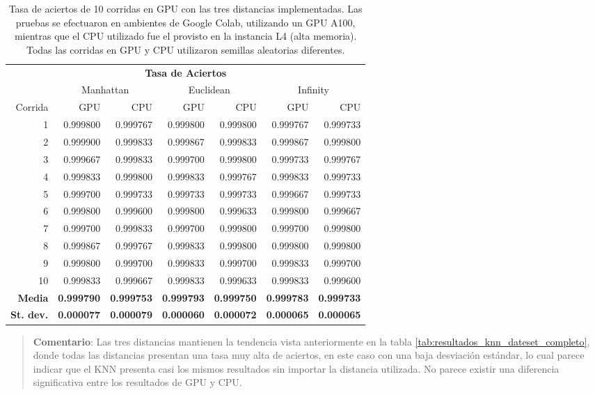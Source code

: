 \documentclass{article}
\begin{document}
\begin{enumerate}
\begin{enumerate}
\begin{enumerate}
\begin{table}[H]
    \centering
\begin{tabular}{r|rrrrrr}
    \toprule
    \multicolumn{7}{c}{\textbf{Tasa de Aciertos}}\\    
    & \multicolumn{2}{c}{Manhattan} & \multicolumn{2}{c}{Euclidean} & \multicolumn{2}{c}{Infinity} \\
    Corrida & GPU & CPU & GPU & CPU & GPU & CPU \\
    \midrule
    1 & 0.999800 & 0.999767 & 0.999800 & 0.999800 & 0.999767 & 0.999733 \\
    2 & 0.999900 & 0.999833 & 0.999867 & 0.999833 & 0.999867 & 0.999800 \\
    3 & 0.999667 & 0.999833 & 0.999700 & 0.999800 & 0.999733 & 0.999767 \\
    4 & 0.999833 & 0.999800 & 0.999833 & 0.999767 & 0.999833 & 0.999733 \\
    5 & 0.999700 & 0.999733 & 0.999733 & 0.999733 & 0.999667 & 0.999733 \\
    6 & 0.999800 & 0.999600 & 0.999800 & 0.999633 & 0.999800 & 0.999667 \\
    7 & 0.999700 & 0.999833 & 0.999700 & 0.999800 & 0.999700 & 0.999800 \\
    8 & 0.999867 & 0.999767 & 0.999833 & 0.999800 & 0.999800 & 0.999800 \\
    9 & 0.999800 & 0.999700 & 0.999833 & 0.999700 & 0.999833 & 0.999700 \\
    10 & 0.999833& 0.999667 & 0.999833 & 0.999633 & 0.999833 & 0.999600 \\
    \midrule
    \textbf{Media}    & \textbf{0.999790} & \textbf{0.999753} & \textbf{0.999793} & \textbf{0.999750} & \textbf{0.999783} & \textbf{0.999733} \\
    \textbf{St. dev.} & \textbf{0.000077} & \textbf{0.000079} & \textbf{0.000060} & \textbf{0.000072} & \textbf{0.000065} & \textbf{0.000065} \\
    \bottomrule
\end{tabular}
\caption{Tasa de aciertos de 10 corridas en GPU con las tres distancias implementadas. Las pruebas se efectuaron en ambientes de Google Colab, utilizando un GPU  A100, mientras que el CPU utilizado fue el provisto en la instancia L4 (alta memoria). Todas las corridas en GPU y CPU utilizaron semillas aleatorias diferentes.}
\label{tab:resultados_10_corridas_gpu_vs_cpu}
\end{table}

\begin{quote}
\textbf{Comentario}: Las tres distancias mantienen la tendencia vista anteriormente en la tabla \ref{tab:resultados_knn_dateset_completo}, donde todas las distancias presentan una tasa muy alta de aciertos, en este caso con una baja desviación estándar, lo cual parece indicar que el KNN presenta casi los mismos resultados sin importar la distancia utilizada. No parece existir una diferencia significativa entre los resultados de GPU y CPU.
\end{quote}


\end{enumerate}
\end{enumerate}
\end{enumerate}
\end{document}
